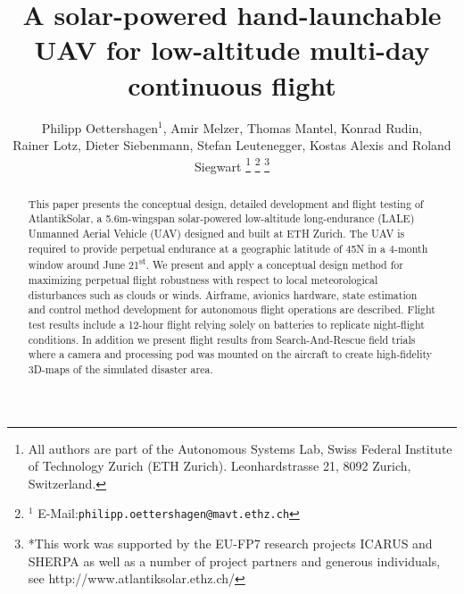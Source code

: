 \documentclass[letterpaper, 10 pt, conference]{ieeeconf}  %
\title{\LARGE \bf A solar-powered hand-launchable UAV for low-altitude multi-day continuous flight}
\author{Philipp Oettershagen$^{1}$, Amir Melzer, Thomas Mantel, Konrad Rudin, \\ Rainer Lotz, Dieter Siebenmann, Stefan Leutenegger, Kostas Alexis and Roland Siegwart%
\thanks{All authors are part of the Autonomous Systems Lab, Swiss Federal Institute of Technology Zurich (ETH Zurich). Leonhardstrasse 21, 8092 Zurich, Switzerland. }
\thanks{$^{1}$ E-Mail:{\tt philipp.oettershagen@mavt.ethz.ch}}%
\thanks{*This work was supported by the EU-FP7 research projects ICARUS and SHERPA as well as a number of project partners and generous individuals, see http://www.atlantiksolar.ethz.ch/  }%
 }
\begin{document}
\maketitle
\thispagestyle{empty}
\pagestyle{empty}

\begin{abstract}
This paper presents the conceptual design, detailed development and flight testing of AtlantikSolar, a 5.6m-wingspan solar-powered low-altitude long-endurance (LALE) Unmanned Aerial Vehicle (UAV) designed and built at ETH Zurich. The UAV is required to provide perpetual endurance at a geographic latitude of 45\degree N in a 4-month window around June 21\textsuperscript{st}. We present and apply a conceptual design method for maximizing perpetual flight robustness with respect to local meteorological disturbances such as clouds or winds. Airframe, avionics hardware, state estimation and control method development for autonomous flight operations are described. Flight test results include a 12-hour flight relying solely on batteries to replicate night-flight conditions. In addition we present flight results from Search-And-Rescue field trials where a camera and processing pod was mounted on the aircraft to create high-fidelity 3D-maps of the simulated disaster area. 
\end{abstract}








\end{document}
